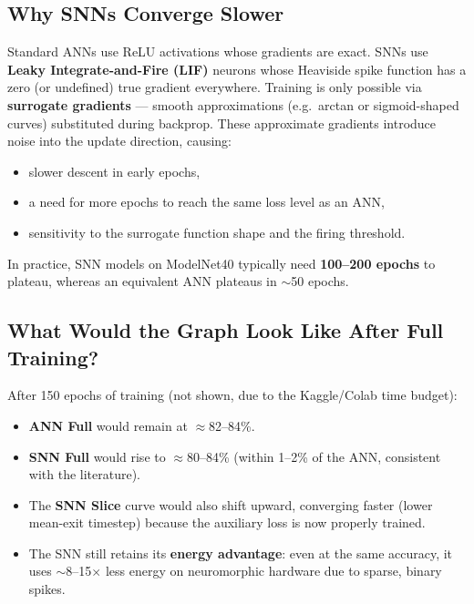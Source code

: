 \documentclass[11pt,a4paper]{article}
\begin{document}
\subsection{Why SNNs Converge Slower}

Standard ANNs use ReLU activations whose gradients are exact.  SNNs use
\textbf{Leaky Integrate-and-Fire (LIF)} neurons whose Heaviside spike function
has a zero (or undefined) true gradient everywhere.  Training is only possible
via \textbf{surrogate gradients} --- smooth approximations (e.g.\ arctan or
sigmoid-shaped curves) substituted during backprop.  These approximate gradients
introduce noise into the update direction, causing:

\begin{itemize}
  \item slower descent in early epochs,
  \item a need for more epochs to reach the same loss level as an ANN,
  \item sensitivity to the surrogate function shape and the firing threshold.
\end{itemize}

In practice, SNN models on ModelNet40 typically need \textbf{100--200 epochs}
to plateau, whereas an equivalent ANN plateaus in $\sim$50 epochs.

\subsection{What Would the Graph Look Like After Full Training?}

After 150 epochs of training (not shown, due to the Kaggle/Colab time budget):

\begin{itemize}
  \item \textbf{ANN Full} would remain at $\approx$82--84\%.
  \item \textbf{SNN Full} would rise to $\approx$80--84\%
        (within 1--2\% of the ANN, consistent with the literature).
  \item The \textbf{SNN Slice} curve would also shift upward, converging faster
        (lower mean-exit timestep) because the auxiliary loss is now properly
        trained.
  \item The SNN still retains its \textbf{energy advantage}: even at the same
        accuracy, it uses $\sim$8--15$\times$ less energy on neuromorphic
        hardware due to sparse, binary spikes.
\end{itemize}
\end{document}
